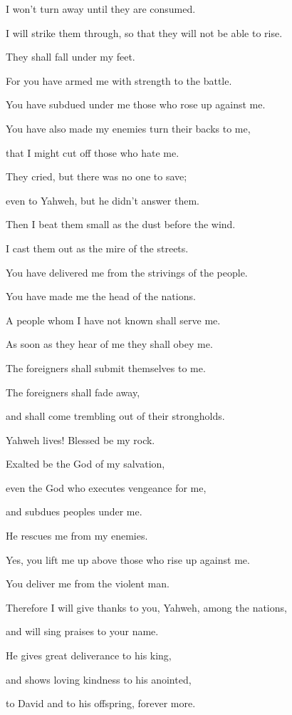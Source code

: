 {\par }{\QB I won’t turn away until they are consumed.
\par }{\Q {}I will strike them through, so that they will not be able to rise.
\par }{\QB They shall fall under my feet.
\par }{\Q {}For you have armed me with strength to the battle.
\par }{\QB You have subdued under me those who rose up against me.
\par }{\Q {}You have also made my enemies turn their backs to me,
\par }{\QB that I might cut off those who hate me.
\par }{\Q {}They cried, but there was no one to save;
\par }{\QB even to Yahweh, but he didn’t answer them.
\par }{\Q {}Then I beat them small as the dust before the wind.
\par }{\QB I cast them out as the mire of the streets.
\par }{\Q {}You have delivered me from the strivings of the people.
\par }{\QB You have made me the head of the nations.
\par }{\Q A people whom I have not known shall serve me.
\par }{\QB {}As soon as they hear of me they shall obey me.
\par }{\QB The foreigners shall submit themselves to me.
\par }{\Q {}The foreigners shall fade away,
\par }{\QB and shall come trembling out of their strongholds.
\par }{\Q {}Yahweh lives! Blessed be my rock.
\par }{\QB Exalted be the God of my salvation,
\par }{\Q {}even the God who executes vengeance for me,
\par }{\QB and subdues peoples under me.
\par }{\Q {}He rescues me from my enemies.
\par }{\QB Yes, you lift me up above those who rise up against me.
\par }{\QB You deliver me from the violent man.
\par }{\Q {}Therefore I will give thanks to you, Yahweh, among the nations,
\par }{\QB and will sing praises to your name.
\par }{\Q {}He gives great deliverance to his king,
\par }{\QB and shows loving kindness to his anointed,
\par }{\QB to David and to his offspring, forever more.

}
